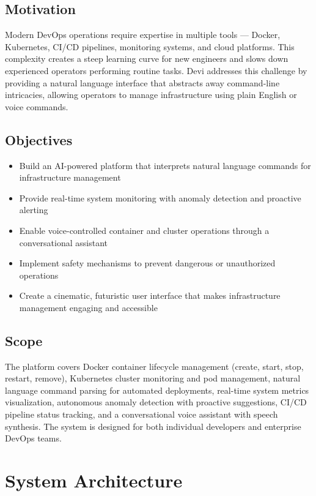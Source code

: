 \documentclass[12pt,a4paper]{report}
\begin{document}
\section{Motivation}
Modern DevOps operations require expertise in multiple tools --- Docker, Kubernetes, CI/CD pipelines, monitoring systems, and cloud platforms. This complexity creates a steep learning curve for new engineers and slows down experienced operators performing routine tasks. Devi addresses this challenge by providing a natural language interface that abstracts away command-line intricacies, allowing operators to manage infrastructure using plain English or voice commands.

\section{Objectives}
\begin{itemize}
  \item Build an AI-powered platform that interprets natural language commands for infrastructure management
  \item Provide real-time system monitoring with anomaly detection and proactive alerting
  \item Enable voice-controlled container and cluster operations through a conversational assistant
  \item Implement safety mechanisms to prevent dangerous or unauthorized operations
  \item Create a cinematic, futuristic user interface that makes infrastructure management engaging and accessible
\end{itemize}

\section{Scope}
The platform covers Docker container lifecycle management (create, start, stop, restart, remove), Kubernetes cluster monitoring and pod management, natural language command parsing for automated deployments, real-time system metrics visualization, autonomous anomaly detection with proactive suggestions, CI/CD pipeline status tracking, and a conversational voice assistant with speech synthesis. The system is designed for both individual developers and enterprise DevOps teams.

\chapter{System Architecture}
\end{document}
